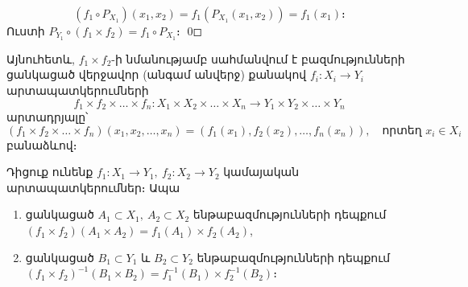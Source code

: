 \documentclass[./main.tex]{subfiles}
\begin{document}
\[(f_1 \circ P_{X_1})(x_1,x_2)=f_1(P_{X_1}(x_1,x_2))=f_1(x_1)։\]
Ուստի $P_{Y_1} \circ (f_1\times f_2)=f_1 \circ P_{X_1}$։ \qed
\par Այնուհետև, $f_1 \times f_2$-ի նմանությամբ սահմանվում է բազմությունների ցանկացած վերջավոր (անգամ անվերջ) քանակով $f_i:X_i\rightarrow Y_i$ արտապատկերումների
\[f_1\times f_2 \times \dots  \times f_n:X_1 \times X_2 \times \dots  \times X_n\rightarrow Y_1\times Y_2\times \dots  \times Y_n\]
արտադրյալը՝
\[(f_1 \times f_2 \times \dots  \times f_n)(x_1, x_2, \dots, x_n)=(f_1(x_1), f_2(x_2), \dots, f_n(x_n)), \quad \text{որտեղ } x_i \in X_i\]
բանաձևով։
\begin{theorem}\label{ch2thm3}
Դիցուք ունենք $f_1:X_1\rightarrow Y_1,\ f_2:X_2 \rightarrow Y_2$ կամայական ար\-տա\-պատ\-կե\-րում\-ներ։ Ապա
\begin{enumerate}
    \item [ա)] ցանկացած $A_1 \subset X_1,\ A_2 \subset X_2$ ենթաբազմությունների դեպքում \\ $(f_1 \times f_2)(A_1 \times A_2)=f_1(A_1)\times f_2(A_2)$,
    \item [բ)] ցանկացած $B_1 \subset Y_1$ և $B_2 \subset Y_2 $ ենթաբազմությունների դեպքում\\ $(f_1 \times f_2)^{-1}(B_1\times B_2)=f_1^{-1}(B_1)\times f_2^{-1}(B_2)$։
\end{enumerate}
\end{theorem}
\end{document}
